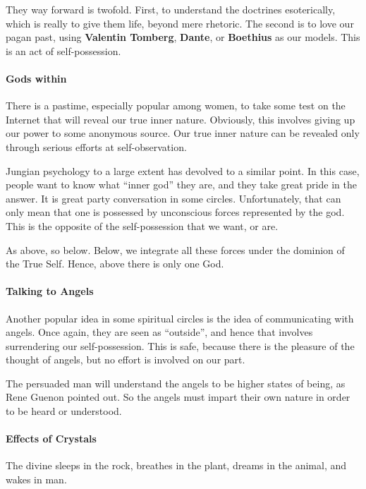 They way forward is twofold. First, to understand the doctrines esoterically, which is really to give them life, beyond mere rhetoric. The second is to love our pagan past, using \textbf{Valentin Tomberg}, \textbf{Dante}, or \textbf{Boethius} as our models. This is an act of self-possession.

\paragraph{Gods within}


There is a pastime, especially popular among women, to take some test on the Internet that will reveal our true inner nature. Obviously, this involves giving up our power to some anonymous source. Our true inner nature can be revealed only through serious efforts at self-observation.

Jungian psychology to a large extent has devolved to a similar point. In this case, people want to know what ``inner god'' they are, and they take great pride in the answer. It is great party conversation in some circles. Unfortunately, that can only mean that one is possessed by unconscious forces represented by the god. This is the opposite of the self-possession that we want, or are.

As above, so below. Below, we integrate all these forces under the dominion of the True Self. Hence, above there is only one God.

\paragraph{Talking to Angels}


Another popular idea in some spiritual circles is the idea of communicating with angels. Once again, they are seen as ``outside'', and hence that involves surrendering our self-possession. This is safe, because there is the pleasure of the thought of angels, but no effort is involved on our part.

The persuaded man will understand the angels to be higher states of being, as Rene Guenon pointed out. So the angels must impart their own nature in order to be heard or understood.

\paragraph{Effects of Crystals}


\begin{quotex}
The divine sleeps in the rock, breathes in the plant, dreams in the animal, and wakes in man.
\end{quotex}


